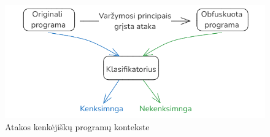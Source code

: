 \begin{frame}
\begin{columns}[b]
        \begin{figure}
            \begin{small}
                \begin{center}
                    \includegraphics[width=\textwidth]{resources/malware_adversarial.png}
                \end{center}
                \caption{Atakos kenkėjiškų programų kontekste}
                \label{fig:malware_adversarial}
            \end{small}
        \end{figure}
    \end{columns}

\end{frame}

